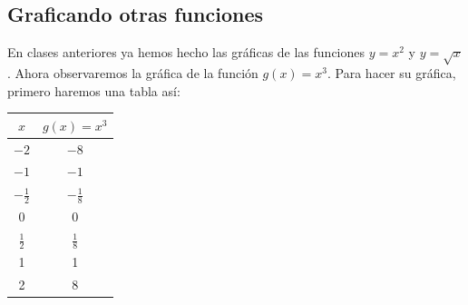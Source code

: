 \documentclass[10pt,twoside]{article}
\begin{document}
\subsection{Graficando otras funciones}
\begin{minipage}{0.45\textwidth}
En clases anteriores ya hemos hecho las gráficas de las funciones $ y=x^2 $ y $ y=\sqrt{x} $. Ahora observaremos la gráfica de la función $ g(x)=x^3 $. Para hacer su gráfica, primero haremos una tabla así:\\

  \begin{tabular}{|c|c|}\hline
$x$ & $ g(x)=x^3 $\\\hline 
$ -2 $ & $ -8 $\\\hline
$ -1 $ & $ -1 $ \\ \hline
$ -\frac{1}{2} $ & $ -\frac{1}{8} $\\\hline
$ 0 $ & $ 0 $\\\hline
$ \frac{1}{2} $ & $ \frac{1}{8} $\\\hline
1 & 1\\\hline
2 & 8 \\\hline
\end{tabular}
\end{minipage}\hfill
\begin{minipage}{0.45\textwidth}
\end{minipage}
\end{document}
